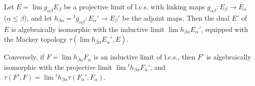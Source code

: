 Let $E = \lim g_{\alpha\beta} E_\beta$ be a projective limit of l.c.s. with linking maps $g_{\alpha\beta}: E_\beta \to E_\alpha$ ($\alpha \leq \beta$), and let $h_{\beta\alpha} = {}^t g_{\alpha\beta}: E_\alpha' \to E_\beta'$ be the adjoint maps. Then the dual $E'$ of $E$ is algebraically isomorphic with the inductive limit $\lim h_{\beta\alpha} E_\alpha'$, equipped with the Mackey topology $\tau(\lim h_{\beta\alpha} E_\alpha', E)$.

Conversely, if $F = \lim h_{\beta\alpha} F_\alpha$ is an inductive limit of l.c.s., then $F'$ is algebraically isomorphic with the projective limit $\lim {}^t h_{\beta\alpha} F_\alpha'$, and $\tau(F', F) = \lim {}^t h_{\beta\alpha} \tau(F_\alpha', F_\alpha)$.
